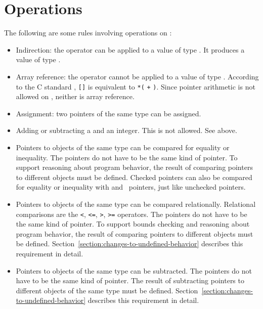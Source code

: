 \section{Operations}

The following are some rules involving operations on \ptrT:

\begin{itemize}
\item
  Indirection: the \code{*} operator can be applied to a value of type
  \ptrT. It produces a value of type .
\item
  Array reference: the \code{[]} operator cannot be applied to a
  value of type \ptrT. According to the C standard ,
  \lstinline|[|\lstinline|]| is equivalent to
  \lstinline|*(| \lstinline|+| \lstinline|)|. Since
  pointer arithmetic is not allowed on \ptrT, neither is array reference.
\item
  Assignment: two pointers of the same type can be assigned.
\item
  Adding or subtracting a \ptrT and an integer. This is not allowed. See above.
\item
  Pointers to objects of the same type can be compared for equality or
  inequality. The pointers do not have to be the same kind of pointer.
  To support reasoning about program behavior, the result of comparing
  pointers to different objects must be defined.  Checked pointers can also
  be compared for equality or inequality with  and \void\ pointers,
  just like unchecked pointers.
\item
  Pointers to objects of the same type can be compared relationally. Relational comparisons are the
  \lstinline|<|, \lstinline|<=|, \lstinline|>|, \lstinline|>=| operators. The pointers do not have
  to be
  the same kind of pointer. To support bounds checking and reasoning about program behavior, the
  result of comparing pointers to different objects must be defined.
  Section~\ref{section:changes-to-undefined-behavior} describes this requirement in detail.
\item
  Pointers to objects of the same type can be subtracted. The pointers do not have to be
  the same kind of
  pointer. The result of subtracting pointers to different objects of
  the same type must be defined. Section~\ref{section:changes-to-undefined-behavior}
  describes this requirement in detail. 
\end{itemize}

